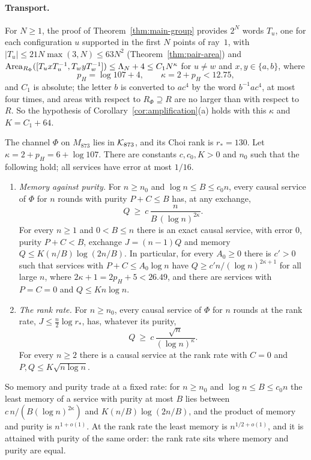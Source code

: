 \paragraph{Transport.} For $N\ge1$, the proof of Theorem~\ref{thm:main-group} provides $2^N$ words $T_u$, one for each configuration $u$
supported in the first $N$ points of ray~$1$, with $|T_u|\le21N\max(3,N)\le63N^2$ (Theorem~\ref{thm:pair-area}) and
$\operatorname{Area}_{R_\Phi}([T_uxT_u^{-1},T_wyT_w^{-1}])\le\Lambda_N+4\le C_1N^{\kappa}$ for $u\ne w$ and $x,y\in\{a,b\}$, where
\[
p_H=\log107+4,\qquad \kappa=2+p_H<12.75,
\]
and $C_1$ is absolute; the letter $b$ is converted to $ac^4$ by the word $b^{-1}ac^4$, at most four times, and areas with respect to
$R_\Phi\supseteq R$ are no larger than with respect to $R$. So the hypothesis of Corollary~\ref{cor:amplification}(a) holds with this $\kappa$ and
$K=C_1+64$.

\begin{theorem}[Theorem B]\label{thm:main-channel}
The channel $\Phi$ on $M_{873}$ lies in $\mathcal K_{873}$, and its Choi rank is $r_*=130$. Let $\kappa=2+p_H=6+\log107$. There are
constants $c,c_0,K>0$ and $n_0$ such that the following hold; all services have error at most $1/16$.
\begin{enumerate}[label=(\alph*),itemsep=1pt]
\item \emph{Memory against purity.} For $n\ge n_0$ and $\log n\le B\le c_0n$, every causal service of $\Phi$ for $n$ rounds with purity
$P+C\le B$ has, at any exchange,
\[
Q\ \ge\ c\,\frac{n}{B\,(\log n)^{2\kappa}} .
\]
For every $n\ge1$ and $0<B\le n$ there is an exact causal service, with error $0$, purity $P+C<B$, exchange $J=(n-1)Q$ and memory
$Q\le K(n/B)\log(2n/B)$. In particular, for every $A_0\ge0$ there is $c'>0$ such that services with $P+C\le A_0\log n$ have
$Q\ge c'n/(\log n)^{2\kappa+1}$ for all large $n$, where $2\kappa+1=2p_H+5<26.49$, and there are services with $P=C=0$ and $Q\le Kn\log n$.
\item \emph{The rank rate.} For $n\ge n_0$, every causal service of $\Phi$ for $n$ rounds at the rank rate, $J\le\frac n2\log r_*$, has, whatever
its purity,
\[
Q\ \ge\ c\,\frac{\sqrt n}{(\log n)^{\kappa}} .
\]
For every $n\ge2$ there is a causal service at the rank rate with $C=0$ and $P,Q\le K\sqrt{n\log n}$.
\end{enumerate}
So memory and purity trade at a fixed rate: for $n\ge n_0$ and $\log n\le B\le c_0n$ the least memory of a service with purity at most $B$ lies
between $c\,n/(B(\log n)^{2\kappa})$ and $K(n/B)\log(2n/B)$, and the product of memory and purity is $n^{1+o(1)}$. At the rank rate the least
memory is $n^{1/2+o(1)}$, and it is attained with purity of the same order: the rank rate sits where memory and purity are equal.
\end{theorem}

